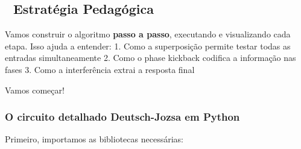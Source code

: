 \documentclass[
  brazilian,
]{report}
\begin{document}
\subsection{🎯 Estratégia Pedagógica}\label{estratuxe9gia-pedaguxf3gica}

Vamos construir o algoritmo \textbf{passo a passo}, executando e
visualizando cada etapa. Isso ajuda a entender: 1. Como a superposição
permite testar todas as entradas simultaneamente 2. Como o phase
kickback codifica a informação nas fases 3. Como a interferência extrai
a resposta final

Vamos começar!

\subsubsection{O circuito detalhado Deutsch-Jozsa em
Python}\label{o-circuito-detalhado-deutsch-jozsa-em-python}

Primeiro, importamos as bibliotecas necessárias:
\end{document}
